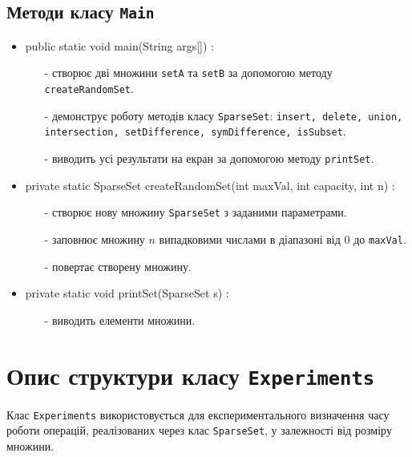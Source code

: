 \documentclass[12pt,a4paper]{article}
\begin{document}
\subsection{Методи класу \texttt{Main}}
\begin{itemize}
    \item public static void main(String args[]) :
    \begin{itemize}
        \item[-] створює дві множини \texttt{setA} та \texttt{setB} за допомогою методу \texttt{createRandomSet}.
        \item[-] демонструє роботу методів класу \texttt{SparseSet}: \texttt{insert, delete, union, intersection, setDifference, symDifference, isSubset}.
        \item[-] виводить усі результати на екран за допомогою методу \texttt{printSet}.
    \end{itemize}

    \item private static SparseSet createRandomSet(int maxVal, int capacity, int n) :
    \begin{itemize}
        \item[-] створює нову множину \texttt{SparseSet} з заданими параметрами.
        \item[-] заповнює множину $n$ випадковими числами в діапазоні від $0$ до \texttt{maxVal}.
        \item[-] повертає створену множину.
    \end{itemize}

    \item private static void printSet(SparseSet s) :
    \begin{itemize}
        \item[-] виводить елементи множини.
    \end{itemize}
\end{itemize}

\section{Опис структури класу \texttt{Experiments}}
Клас \texttt{Experiments} використовується для експериментального визначення часу роботи операцій, реалізованих через клас \texttt{SparseSet}, у залежності від розміру
множини.  
\end{document}

